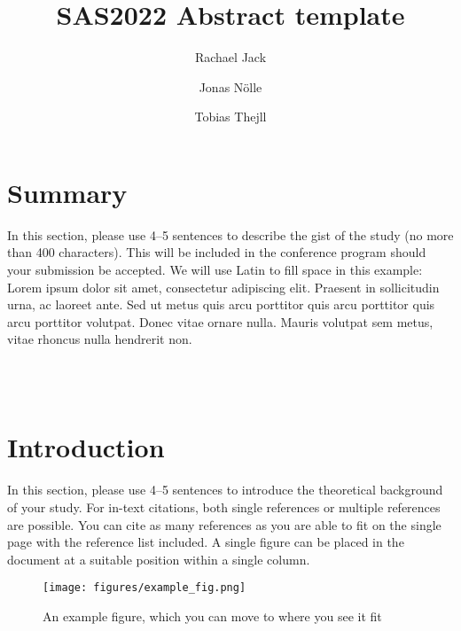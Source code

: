 \documentclass[10pt]{article}
\title{SAS2022 Abstract template} %
\author[1]{Rachael Jack}
\author[2]{Jonas N{\"o}lle}
\author[1,2]{Tobias Thejll\textendash{Madsen}}
\affil[1]{Department of Psychology, University of Glasgow, UK}
\affil[2]{Department of Computing Science, University of Glasgow, UK}
\begin{document}
 
\maketitle
\begin{multicols}{2}

\section{Summary} %
In this section, please use 4--5 sentences to describe the gist of the study (no more than 400 characters). This will be included in the conference program should your submission be accepted. We will use Latin to fill space in this example: Lorem ipsum dolor sit amet, consectetur adipiscing elit. Praesent in sollicitudin urna, ac laoreet ante. Sed ut metus quis arcu porttitor quis arcu porttitor quis arcu porttitor volutpat. Donec vitae ornare nulla. Mauris volutpat sem metus, vitae rhoncus nulla hendrerit non.

\noindent{}\\

\noindent {} \\

\section{Introduction}
In this section, please use 4--5 sentences to introduce the theoretical background of your study. For in-text citations, both single references \citep{fiskeLexicalFallacyEmotion2020} or multiple references \citep{davidsonAffectiveStyleAffective1998,jackFacialExpressionsEmotion2012} are possible. You can cite as many references as you are able to fit on the single page with the reference list included. A single figure can be placed in the document at a suitable position within a single column. 


\begin{figure}[H] 
\texttt{[image: figures/example\_fig.png]}
\caption{An example figure, which you can move to where you see it fit}
\label{fig:follow_half}
\end{figure}


\end{multicols}
\end{document}
